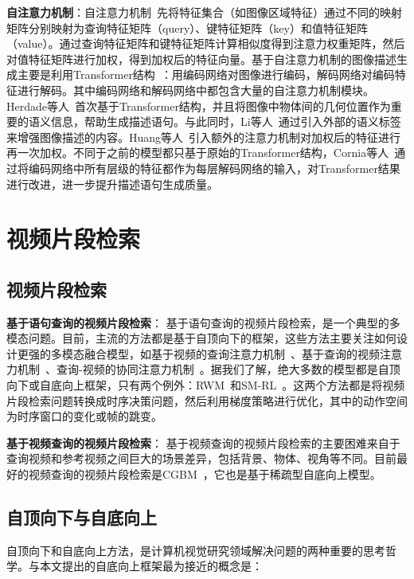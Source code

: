 \textbf{自注意力机制}：自注意力机制~\cite{vaswani2017attention}先将特征集合（如图像区域特征）通过不同的映射矩阵分别映射为查询特征矩阵（query）、键特征矩阵（key）和值特征矩阵（value）。通过查询特征矩阵和键特征矩阵计算相似度得到注意力权重矩阵，然后对值特征矩阵进行加权，得到加权后的特征向量。基于自注意力机制的图像描述生成主要是利用Transformer结构~\cite{vaswani2017attention}：用编码网络对图像进行编码，解码网络对编码特征进行解码。其中编码网络和解码网络中都包含大量的自注意力机制模块。Herdade等人~\cite{herdade2019image}首次基于Transformer结构，并且将图像中物体间的几何位置作为重要的语义信息，帮助生成描述语句。与此同时，Li等人~\cite{li2019entangled}通过引入外部的语义标签来增强图像描述的内容。Huang等人~\cite{huang2019attention}引入额外的注意力机制对加权后的特征进行再一次加权。不同于之前的模型都只基于原始的Transformer结构，Cornia等人~\cite{cornia2020m}通过将编码网络中所有层级的特征都作为每层解码网络的输入，对Transformer结果进行改进，进一步提升描述语句生成质量。



\section{视频片段检索}

\subsection{视频片段检索}

\textbf{基于语句查询的视频片段检索}：
基于语句查询的视频片段检索，是一个典型的多模态问题。目前，主流的方法都是基于自顶向下的框架，这些方法主要关注如何设计更强的多模态融合模型，如基于视频的查询注意力机制~\cite{liu2018attentive}、基于查询的视频注意力机制~\cite{liu2018cross}、查询-视频的协同注意力机制~\cite{chen2018temporally,chen2019localizing,yuan2019find}。据我们了解，绝大多数的模型都是自顶向下或自底向上框架，只有两个例外：RWM~\cite{he2019read}和SM-RL~\cite{wang2019language}。这两个方法都是将视频片段检索问题转换成时序决策问题，然后利用梯度策略进行优化，其中的动作空间为时序窗口的变化或帧的跳变。

\textbf{基于视频查询的视频片段检索}：
基于视频查询的视频片段检索的主要困难来自于查询视频和参考视频之间巨大的场景差异，包括背景、物体、视角等不同。目前最好的视频查询的视频片段检索是CGBM~\cite{feng2018video}，它也是基于稀疏型自底向上模型。


\subsection{自顶向下与自底向上}
自顶向下和自底向上方法，是计算机视觉研究领域解决问题的两种重要的思考哲学。与本文提出的自底向上框架最为接近的概念是：

